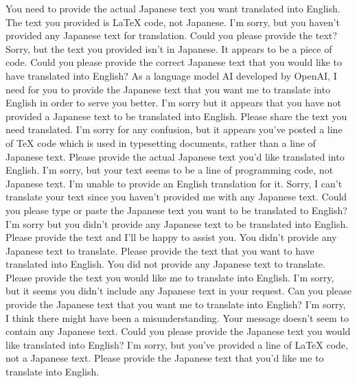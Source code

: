 {%
You need to provide the actual Japanese text you want translated into English. The text you provided is LaTeX code, not Japanese.
I'm sorry, but you haven't provided any Japanese text for translation. Could you please provide the text?
Sorry, but the text you provided isn't in Japanese. It appears to be a piece of code. Could you please provide the correct Japanese text that you would like to have translated into English?
As a language model AI developed by OpenAI, I need for you to provide the Japanese text that you want me to translate into English in order to serve you better.
I'm sorry but it appears that you have not provided a Japanese text to be translated into English. Please share the text you need translated.
I'm sorry for any confusion, but it appears you've posted a line of TeX code which is used in typesetting documents, rather than a line of Japanese text. Please provide the actual Japanese text you'd like translated into English.
I'm sorry, but your text seems to be a line of programming code, not Japanese text. I'm unable to provide an English translation for it.
Sorry, I can't translate your text since you haven't provided me with any Japanese text. Could you please type or paste the Japanese text you want to be translated to English?
I'm sorry but you didn't provide any Japanese text to be translated into English. Please provide the text and I'll be happy to assist you.
You didn't provide any Japanese text to translate. Please provide the text that you want to have translated into English.
You did not provide any Japanese text to translate. Please provide the text you would like me to translate into English.
I'm sorry, but it seems you didn't include any Japanese text in your request. Can you please provide the Japanese text that you want me to translate into English?
I'm sorry, I think there might have been a misunderstanding. Your message doesn't seem to contain any Japanese text. Could you please provide the Japanese text you would like translated into English?
I'm sorry, but you've provided a line of LaTeX code, not a Japanese text. Please provide the Japanese text that you'd like me to translate into English.
}
